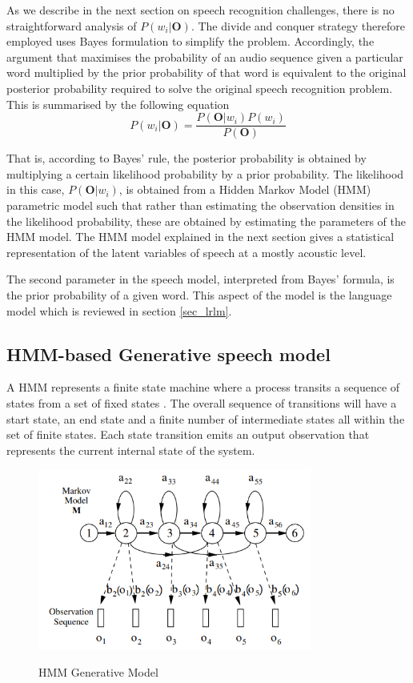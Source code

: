 As we describe in the next section on speech recognition challenges, there is no straightforward analysis of $P(w_i|\mathbf{O})$.  The divide and conquer strategy therefore employed uses Bayes formulation to simplify the problem.  Accordingly, the argument that maximises the probability of an audio sequence given a particular word multiplied by the prior probability of that word is equivalent to the original posterior probability required to solve the original speech recognition problem. This is summarised by the following equation
\begin{equation}P(w_i|\mathbf{O})=\frac{P(\mathbf{O}|w_i)P(w_i)}{P(\mathbf{O})}
\label{eqn_2_3_bayes_sr}
\end{equation}

That is, according to Bayes’ rule, the posterior probability is obtained by multiplying a certain likelihood probability by a prior probability.  The likelihood in this case, $P(\mathbf{O}|w_i)$, is obtained from a Hidden Markov Model (HMM) parametric model such that rather than estimating the observation densities in the likelihood probability, these are obtained by estimating the parameters of the HMM model.  The HMM model explained in the next section gives a statistical representation of the latent variables of speech at a mostly acoustic level.

The second parameter in the speech model, interpreted from Bayes' formula, is the prior probability of a given word.  This aspect of the model is the language model which is reviewed in section \ref{sec_lrlm}.

\subsection{HMM-based Generative speech model}
A HMM represents a finite state machine where a process transits a sequence of states from a set of fixed states \citep{gales2008application, young2002htk}. The overall sequence of transitions will have a start state, an end state and a finite number of intermediate states all within the set of finite states.  Each state transition emits an output observation that represents the current internal state of the system.

\begin{figure}
\centering
  \includegraphics[width=9cm]{thesis/images/hmm}\\
  \caption{HMM Generative Model}\cite{young2002htk}\label{fig_2_1_hmm}
\end{figure}

